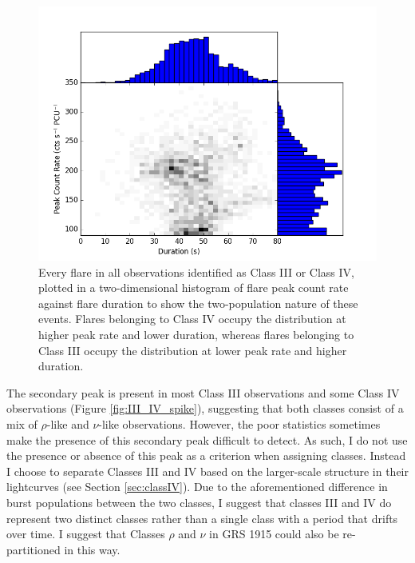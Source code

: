 \begin{figure}
    \includegraphics[width=\columnwidth, trim = 0mm 0mm 0mm 0mm]{images/GJBurst.png}
    \captionsetup{singlelinecheck=off}
    \caption[Every flare in all observations identified as Class III or Class IV, plotted in a two-dimensional histogram of flare peak count rate against flare duration to show the two-population nature of these events.]{Every flare in all observations identified as Class III or Class IV, plotted in a two-dimensional histogram of flare peak count rate against flare duration to show the two-population nature of these events.  Flares belonging to Class IV occupy the distribution at higher peak rate and lower duration, whereas flares belonging to Class III occupy the distribution at lower peak rate and higher duration.}
   \label{fig:III_IV_burst}
\end{figure}

\par The secondary peak is present in most Class III observations and some Class IV observations (Figure \ref{fig:III_IV_spike}), suggesting that both classes consist of a mix of $\rho$-like and $\nu$-like observations.  However, the poor statistics sometimes make the presence of this secondary peak difficult to detect.  As such, I do not use the presence or absence of this peak as a criterion when assigning classes.  Instead I choose to separate Classes III and IV based on the larger-scale structure in their lightcurves (see Section \ref{sec:classIV}).  Due to the aforementioned difference in burst populations between the two classes, I suggest that classes III and IV do represent two distinct classes rather than a single class with a period that drifts over time.  I suggest that Classes $\rho$ and $\nu$ in GRS 1915 could also be re-partitioned in this way.

